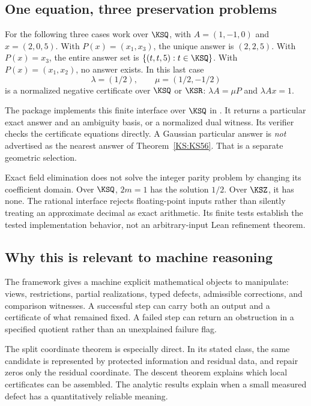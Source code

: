 \subsection{One equation, three preservation problems}
For the following three cases work over \(\KSQ\), with \(A=(1,-1,0)\) and \(x=(2,0,5)\). With \(P(x)=(x_1,x_3)\), the unique answer is \((2,2,5)\). With \(P(x)=x_3\), the entire answer set is \(\{(t,t,5):t\in\KSQ\}\). With \(P(x)=(x_1,x_2)\), no answer exists. In this last case
\[
 \lambda=(1/2),\qquad\mu=(1/2,-1/2)
\]
is a normalized negative certificate over \(\KSQ\) or \(\KSR\): \(\lambda A=\mu P\) and \(\lambda Ax=1\).

The package implements this finite interface over \(\KSQ\) in . It returns a particular exact answer and an ambiguity basis, or a normalized dual witness. Its verifier checks the certificate equations directly. A Gaussian particular answer is \emph{not} advertised as the nearest answer of Theorem~\ref{KS:KS56}. That is a separate geometric selection.

Exact field elimination does not solve the integer parity problem by changing its coefficient domain. Over \(\KSQ\), \(2m=1\) has the solution \(1/2\). Over \(\KSZ\), it has none. The rational interface rejects floating-point inputs rather than silently treating an approximate decimal as exact arithmetic. Its finite tests establish the tested implementation behavior, not an arbitrary-input Lean refinement theorem.

\subsection{Why this is relevant to machine reasoning}
The framework gives a machine explicit mathematical objects to manipulate: views, restrictions, partial realizations, typed defects, admissible corrections, and comparison witnesses. A successful step can carry both an output and a certificate of what remained fixed. A failed step can return an obstruction in a specified quotient rather than an unexplained failure flag.

The split coordinate theorem is especially direct. In its stated class, the same candidate is represented by protected information and residual data, and repair zeros only the residual coordinate. The descent theorem explains which local certificates can be assembled. The analytic results explain when a small measured defect has a quantitatively reliable meaning.

